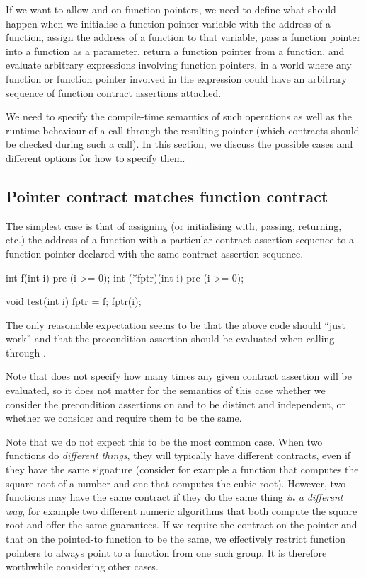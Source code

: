 If we want to allow  and  on function pointers, we need to define what should happen when we initialise a function pointer variable with the address of a function, assign the address of a function to that variable, pass a function pointer into a function as a parameter, return a function pointer from a function, and evaluate arbitrary expressions involving function pointers, in a world where any function or function pointer involved in the expression could have an arbitrary sequence of function contract assertions attached.

We need to specify the compile-time semantics of such operations as well as the runtime behaviour of a call through the resulting pointer (which contracts should be checked during such a call). In this section, we discuss the possible cases and different options for how to specify them.


\subsection{Pointer contract matches function contract}
\label{matching}

The simplest case is that of assigning (or initialising with, passing, returning, etc.) the address of a function with a particular contract assertion sequence to a function pointer declared with the same contract assertion sequence. 
\begin{codeblock}
int f(int i) pre (i >= 0);
int (*fptr)(int i) pre (i >= 0);

void test(int i) {
  fptr = f; 
  fptr(i); 
}
\end{codeblock}
The only reasonable expectation seems to be that the above code should ``just work'' and that the precondition assertion  should be evaluated when calling  through .

Note that \cite{P2900R8} does not specify how many times any given contract assertion will be evaluated, so it does not matter for the semantics of this case whether we consider the precondition assertions on  and  to be distinct and independent, or whether we consider and require them to be the same.

Note that we do not expect this to be the most common case. When two functions do \emph{different things}, they will typically have different contracts, even if they have the same signature (consider for example a function that computes the square root of a number and one that computes the cubic root). However, two functions may have the same contract if they do the same thing \emph{in a different way}, for example two different numeric algorithms that both compute the square root and offer the same guarantees. If we require the contract on the pointer and that on the pointed-to function to be the same, we effectively restrict function pointers to always point to a function from one such group. It is therefore worthwhile considering other cases.

